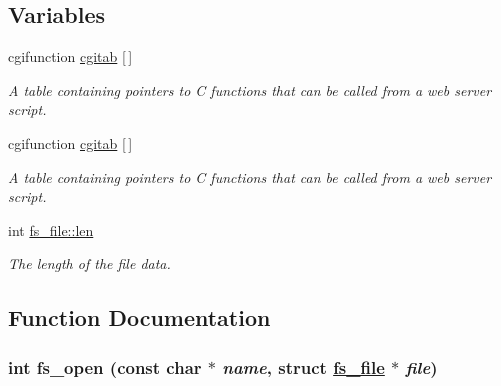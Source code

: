 \subsection*{Variables}
\begin{CompactItemize}
\item 
\hypertarget{a00082_g04d2c4d8d3c35856348c04fa245a9bb3}{
cgifunction \hyperlink{a00082_g04d2c4d8d3c35856348c04fa245a9bb3}{cgitab} \mbox{[}$\,$\mbox{]}}
\label{a00082_g04d2c4d8d3c35856348c04fa245a9bb3}

\begin{CompactList}\small\item\em A table containing pointers to C functions that can be called from a web server script. \item\end{CompactList}\item 
\hypertarget{a00082_g04d2c4d8d3c35856348c04fa245a9bb3}{
cgifunction \hyperlink{a00082_g04d2c4d8d3c35856348c04fa245a9bb3}{cgitab} \mbox{[}$\,$\mbox{]}}
\label{a00082_g04d2c4d8d3c35856348c04fa245a9bb3}

\begin{CompactList}\small\item\em A table containing pointers to C functions that can be called from a web server script. \item\end{CompactList}\item 
\hypertarget{a00082_g99a16a5082bf9510cb1cb8069402f1f0}{
int \hyperlink{a00082_g99a16a5082bf9510cb1cb8069402f1f0}{fs\_\-file::len}}
\label{a00082_g99a16a5082bf9510cb1cb8069402f1f0}

\begin{CompactList}\small\item\em The length of the file data. \item\end{CompactList}\end{CompactItemize}


\subsection{Function Documentation}
\hypertarget{a00082_g31dac76e56ce334835427efcfb58e2bd}{
\subsubsection[fs\_\-open]{\setlength{\rightskip}{0pt plus 5cm}int fs\_\-open (const char $\ast$ {\em name}, struct \hyperlink{a00026}{fs\_\-file} $\ast$ {\em file})}}
\label{a00082_g31dac76e56ce334835427efcfb58e2bd}


